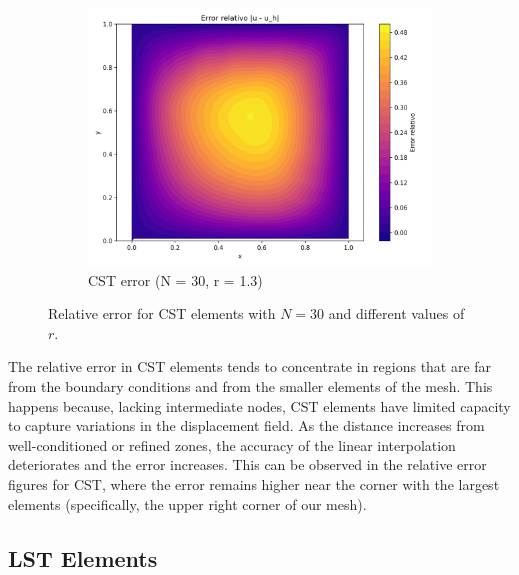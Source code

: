 \documentclass[12pt]{article}
\begin{document}
\begin{figure}[H]
    \hfill
    \begin{subfigure}[t]{0.32\textwidth}
        \centering
        \includegraphics[width=\textwidth]{Graficos/33/CST_relative_error_colormap.png}
        \caption{CST error (N = 30, r = 1.3)}
        \label{fig:cst_error_r1.3_n30}
    \end{subfigure}
    \caption{Relative error for CST elements with $N = 30$ and different values of $r$.}
    \label{fig:cst_error_comparison_n30}
\end{figure}

The relative error in CST elements tends to concentrate in regions that are far from the boundary conditions and from the smaller elements of the mesh. This happens because, lacking intermediate nodes, CST elements have limited capacity to capture variations in the displacement field. As the distance increases from well-conditioned or refined zones, the accuracy of the linear interpolation deteriorates and the error increases. This can be observed in the relative error figures for CST, where the error remains higher near the corner with the largest elements (specifically, the upper right corner of our mesh).


\subsection{LST Elements}
\end{document}
